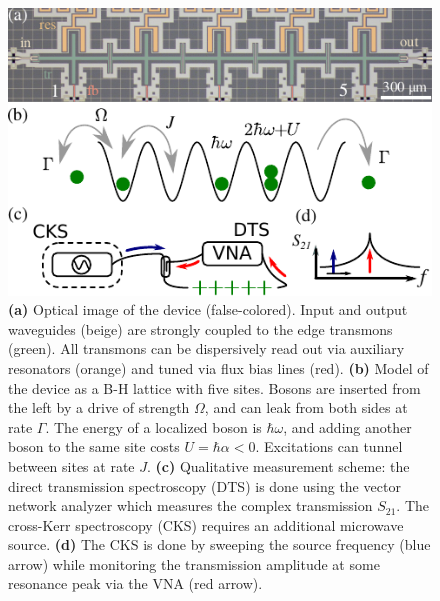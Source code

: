 \documentclass[%
 aps, pra,
 amsmath,amssymb,
 reprint,%
superscriptaddress
]{revtex4-2}
\begin{document}
\begin{figure}
	\centering
	\includegraphics[width=1\linewidth]{Pictures/scheme.pdf}
	\caption{\textbf{(a)} Optical image of the device (false-colored). Input and output waveguides (beige) are strongly coupled to the edge transmons (green). All transmons can be dispersively read out via auxiliary resonators (orange) and tuned via flux bias lines (red). \textbf{(b)} Model of the device as a B-H lattice with five sites. Bosons are inserted from the left by a drive of strength $\Omega$, and can leak from both sides at rate $\Gamma$. The energy of a localized boson is $\hbar \omega$, and adding another boson to the same site costs $U = \hbar \alpha < 0$. Excitations can tunnel between sites at rate $J$. \textbf{(c)} Qualitative measurement scheme: the direct transmission spectroscopy (DTS) is done using the vector network analyzer which measures the complex transmission $ S_{21} $. The cross-Kerr spectroscopy (CKS) requires an additional microwave source. \textbf{(d)} The CKS is done by sweeping the source frequency (blue arrow) while monitoring the transmission amplitude at some resonance peak via the VNA (red arrow).}
	\label{fig:scheme}
\end{figure}
	
\end{document}
